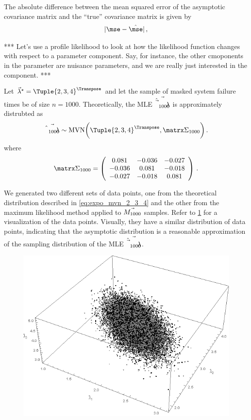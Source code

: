\documentclass[../main.tex]{subfiles}
\begin{document}
The absolute difference between the mean squared error of the asymptotic covariance matrix and the ``true'' covariance matrix is given by
\begin{equation}
    | \mse - \estimator\mse |\,,
\end{equation}





***
Let's use a profile likelihood to look at how the likelihood function changes 
with respect to a parameter component. Say, for instance, the other cmoponents 
in the parameter are nuisance parameters, and we are really just interested in 
the \jth component.
***



Let $\tparam{\vec\lambda} = \Tuple{2,3,4}^\Transpose$ and let the sample of 
masked system failure times be of size $n=1000$. Theoretically, the MLE 
$\vec{\hat{\vec\lambda}_{1000}}$ is approximately distrubted as
\begin{equation}
\label{eq:expo_mvn_2_3_4}
    \vec{\estimator{\lambda}_{1000}} \sim \mathrm{MVN} \bigg ( 
    \Tuple{2,3,4}^\Transpose, \covn{1000} \bigg )\,.
\end{equation}
where
\begin{equation}
    \covn{1000} =
    \left(
        \begin{array}{ccc}
            0.081	&   -0.036  &   -0.027\\
            -0.036  &   0.081   &   -0.018\\
            -0.027  &   -0.018  &   0.081
        \end{array}
    \right)\,.
\end{equation}

We generated two different sets of data points, one from the theoretical distribution described in \cref{eq:expo_mvn_2_3_4} and the other from the maximum likelihood method applied to $\vec{M_{1000}}$ samples. Refer to \cref{fig:theory_vs_actual} for a visualization of the data points. Visually, they have a similar distribution of data points, indicating that the asymptotic distribution is a reasonable approximation of the sampling distribution of the MLE $\vec{\hat{\vec\lambda}_{1000}}$.
\begin{figure}
\centering
\includegraphics[width=0.5\linewidth]{superimposed.png}
\label{fig:theory_vs_actual}
\end{figure}
\end{document}

